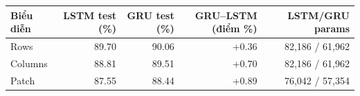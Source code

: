 \begin{tabular}{lrrrr}
\toprule
Biểu diễn & LSTM test (\%) & GRU test (\%) & GRU--LSTM (điểm \%) & LSTM/GRU params\\
\midrule
Rows & 89.70 & 90.06 & +0.36 & 82,186 / 61,962\\
Columns & 88.81 & 89.51 & +0.70 & 82,186 / 61,962\\
Patch & 87.55 & 88.44 & +0.89 & 76,042 / 57,354\\
\bottomrule
\end{tabular}
